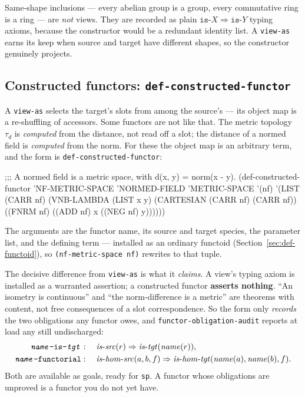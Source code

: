 \begin{remark}
Same-shape inclusions --- every abelian group is a group, every
commutative ring is a ring --- are \emph{not} views.  They are recorded
as plain $\texttt{is-}X \Rightarrow \texttt{is-}Y$ typing axioms, because
the constructor would be a redundant identity list.  A \texttt{view-as}
earns its keep when source and target have different shapes, so the
constructor genuinely projects.
\end{remark}

\subsection{Constructed functors: \texttt{def-constructed-functor}}
\label{sec:constructed-functor}

A \texttt{view-as} selects the target's slots from among the source's --- its
object map is a re-shuffling of accessors.  Some functors are not like that.
The metric topology $\tau_d$ is \emph{computed} from the distance, not read off a
slot; the distance of a normed field is \emph{computed} from the norm.  For these
the object map is an arbitrary term, and the form is
\texttt{def-constructed-functor}:

\begin{VNBcode}
;;; A normed field is a metric space, with d(x, y) = norm(x - y).
(def-constructed-functor 'NF-METRIC-SPACE 'NORMED-FIELD 'METRIC-SPACE '(nf)
  '(LIST (CARR nf)
         (VNB-LAMBDA (LIST x y) (CARTESIAN (CARR nf) (CARR nf)) ((FNRM nf) ((ADD nf) x ((NEG nf) y))))))
\end{VNBcode}

The arguments are the functor name, its source and target species, the
parameter list, and the defining term --- installed as an ordinary functoid
(Section~\ref{sec:def-functoid}), so \texttt{(nf-metric-space nf)} rewrites to
that tuple.

The decisive difference from \texttt{view-as} is what it \emph{claims}.  A view's
typing axiom is installed as a warranted assertion; a constructed functor
\textbf{asserts nothing}.  ``An isometry is continuous'' and ``the norm-difference
is a metric'' are theorems with content, not free consequences of a slot
correspondence.  So the form only \emph{records} the two obligations any functor
owes, and \texttt{functor-obligation-audit} reports at load any still
undischarged:
\[
  \begin{aligned}
    \texttt{\textit{name}-is-\textit{tgt}} &:\quad
      \mathit{is\text{-}src}(r) \Rightarrow \mathit{is\text{-}tgt}(\mathit{name}(r)), \\
    \texttt{\textit{name}-functorial} &:\quad
      \mathit{is\text{-}hom\text{-}src}(a, b, f) \Rightarrow
      \mathit{is\text{-}hom\text{-}tgt}(\mathit{name}(a), \mathit{name}(b), f).
  \end{aligned}
\]
Both are available as goals, ready for \texttt{sp}.  A functor whose obligations
are unproved is a functor you do not yet have.
